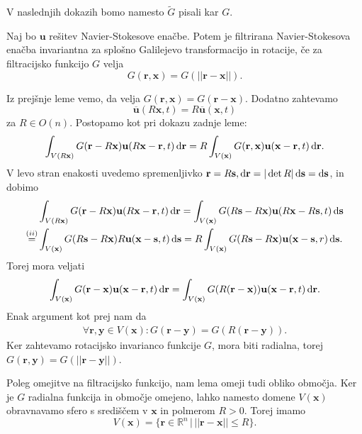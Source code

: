 \documentclass[mat2, tisk]{fmfdelo}
\newcommand{\R}{\mathbb R}
\newcommand{\bd}{\textbf}
\begin{document}
\begin{opomba}
V naslednjih dokazih bomo namesto $\tilde{G}$ pisali kar $G$.
\end{opomba}

\begin{lema}
  Naj bo $\bd{u}$ rešitev Navier-Stokesove enačbe. Potem je filtrirana Navier-Stokesova enačba 
  invariantna za splošno Galilejevo transformacijo in rotacije, če za filtracijsko funkcijo $G$ velja 
  $$
  G(\bd{r}, \bd{x}) = {G}(||\bd{r} - \bd{x}||).
  $$
  \end{lema}

\begin{dokaz}
Iz prejšnje leme vemo, da velja $G(\bd{r}, \bd{x}) = G(\bd{r} - \bd{x})$. Dodatno zahtevamo 
$$
\overline{\bd{u}}(R\bd{x}, t) = R \overline{\bd{u}}(\bd{x}, t)
$$
za $R\in O(n)$. Postopamo kot pri dokazu zadnje leme:
$$\int_{V(R\bd{x})} G(\bd{r} - R\bd{x}) \bd{u}(R\bd{x} - \bd{r}, t)\dif \bd{r} = R \int_{V(\bd{x})} G(\bd{r}, \bd{x}) \bd{u}(\bd{x} - \bd{r}, t)\dif \bd{r}.$$
V levo stran enakosti uvedemo spremenljivko $\bd{r} = R \bd{s}, \dif \bd{r} = |\det{R}| \dif \bd{s} = \dif \bd{s}$, in dobimo
\begin{align*}
&\int_{V(R\bd{x})} G(\bd{r} - R\bd{x}) \bd{u}(R\bd{x} - \bd{r}, t)\dif \bd{r} = \int_{V(\bd{x})} G(R\bd{s} - R\bd{x}) \bd{u}(R\bd{x} - R\bd{s}, t)\dif \bd{s} \\
\stackrel{(ii)}{=} &\int_{V(\bd{x})} G(R\bd{s} - R\bd{x}) R\bd{u}(\bd{x} - \bd{s}, t)\dif \bd{s} = R\int_{V(\bd{x})} G(R\bd{s} - R\bd{x}) \bd{u}(\bd{x} - \bd{s}, r)\dif \bd{s}.
\end{align*}
Torej mora veljati
$$
\int_{V(\bd{x})} G(\bd{r} - \bd{x}) \bd{u}(\bd{x} - \bd{r}, t)\dif \bd{r} = \int_{V(\bd{x})} G(R(\bd{r} - \bd{x})) \bd{u}(\bd{x} - \bd{r}, t)\dif \bd{r}.
$$
Enak argument kot prej nam da
\begin{align*}
\forall \bd{r}, \bd{y}\in V(\bd{x}): G(\bd{r} - \bd{y}) = G(R(\bd{r} - \bd{y})).
\end{align*}
Ker zahtevamo rotacijsko invarianco funkcije $G$, mora biti radialna, torej \\ $G(\bd{r}, \bd{y}) = G(||\bd{r} - \bd{y}||)$.
\end{dokaz}
  
Poleg omejitve na filtracijsko funkcijo, nam lema omeji tudi obliko območja.
Ker je $G$ radialna funkcija in območje omejeno, lahko namesto domene $V(\bd{x})$ obravnavamo 
sfero s središčem v $\bd{x}$ in polmerom $R > 0$. Torej imamo
$$
V(\bd{x}) = \{\bd{r} \in \R^n \,|\, ||\bd{r} - \bd{x}|| \leq R\}.
$$
\end{document}
